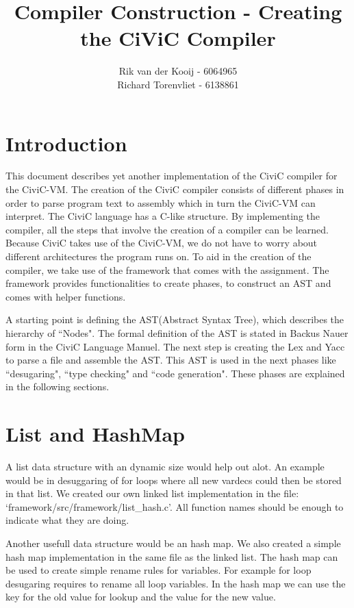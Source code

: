 \documentclass[a4paper]{article}
\author{Rik van der Kooij - 6064965\\
Richard Torenvliet - 6138861}
\title{Compiler Construction - Creating the CiViC Compiler}
\begin{document}
\lstset{
    numbers=left,
    tabsize=2,
}


\maketitle
\tableofcontents


\section{Introduction}
This document describes yet another implementation of the CiviC compiler for
the CiviC-VM. The creation of the CiviC compiler consists of different phases
in order to parse program text to assembly which in turn the CiviC-VM can
interpret. The CiviC language has a C-like structure. By implementing the
compiler, all the steps that involve the creation of a compiler can be learned.
Because CiviC takes use of the CiviC-VM, we do not have to worry about
different architectures the program runs on. To aid in the creation of the
compiler, we take use of the framework that comes with the assignment. The framework provides
functionalities to create phases, to construct an AST and comes with helper
functions.

A starting point is defining the AST(Abstract Syntax Tree), which describes the
hierarchy of ``Nodes". The formal definition of the AST is stated in Backus
Nauer form in the CiviC Language Manuel. The next step is creating the Lex and
Yacc to parse a file and assemble the AST. This AST is used in the next phases
like ``desugaring", ``type checking" and ``code generation". These phases are
explained in the following sections.

\section{List and HashMap}
A list data structure with an dynamic size would help out alot. An example
would be in  desuggaring of for loops where all new vardecs could then be
stored in that list. We created our own linked list implementation in the file:
`framework/src/framework/list\_hash.c'. All function names should be enough to
indicate what they are doing.

Another usefull data structure would be an hash map. We also created a simple
hash map implementation in the same file as the linked list. The hash map can
be used to create simple rename rules for variables. For example for loop
desugaring requires to rename all loop variables. In the hash map we can use
the key for the old value for lookup and the value for the new value.
\end{document}
